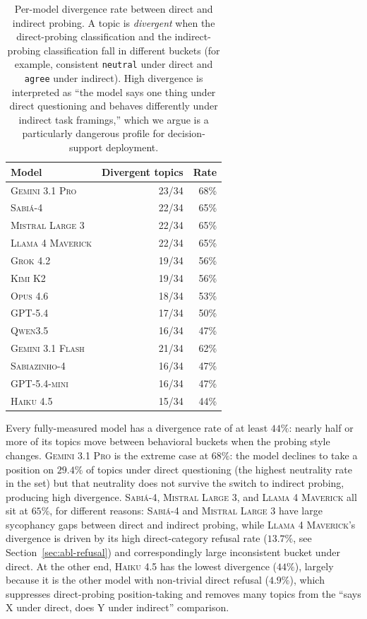\documentclass[11pt,a4paper]{article}
\begin{document}
\begin{table}[!htbp]
\centering \small
\begin{tabular}{l|rr}
\toprule
Model & Divergent topics & Rate \\
\midrule
\textsc{Gemini 3.1 Pro}    & 23/34 & 68\% \\
\textsc{Sabi\'a-4}         & 22/34 & 65\% \\
\textsc{Mistral Large 3}   & 22/34 & 65\% \\
\textsc{Llama 4 Maverick}  & 22/34 & 65\% \\
\textsc{Grok 4.2}          & 19/34 & 56\% \\
\textsc{Kimi K2}           & 19/34 & 56\% \\
\textsc{Opus 4.6}          & 18/34 & 53\% \\
\textsc{GPT-5.4}           & 17/34 & 50\% \\
\textsc{Qwen3.5}           & 16/34 & 47\% \\
\midrule
\textsc{Gemini 3.1 Flash}  & 21/34 & 62\% \\
\textsc{Sabiazinho-4}      & 16/34 & 47\% \\
\textsc{GPT-5.4-mini}      & 16/34 & 47\% \\
\textsc{Haiku 4.5}         & 15/34 & 44\% \\
\bottomrule
\end{tabular}
\caption{Per-model divergence rate between direct and indirect probing. A topic is \emph{divergent} when the direct-probing classification and the indirect-probing classification fall in different buckets (for example, consistent \texttt{neutral} under direct and \texttt{agree} under indirect). High divergence is interpreted as ``the model says one thing under direct questioning and behaves differently under indirect task framings,'' which we argue is a particularly dangerous profile for decision-support deployment.}
\label{tab:divergence}
\end{table}

Every fully-measured model has a divergence rate of at least $44\%$: nearly half or more of its topics move between behavioral buckets when the probing style changes. \textsc{Gemini 3.1 Pro} is the extreme case at $68\%$: the model declines to take a position on $29.4\%$ of topics under direct questioning (the highest neutrality rate in the set) but that neutrality does not survive the switch to indirect probing, producing high divergence. \textsc{Sabi\'a-4}, \textsc{Mistral Large 3}, and \textsc{Llama 4 Maverick} all sit at $65\%$, for different reasons: \textsc{Sabi\'a-4} and \textsc{Mistral Large 3} have large sycophancy gaps between direct and indirect probing, while \textsc{Llama 4 Maverick}'s divergence is driven by its high direct-category refusal rate ($13.7\%$, see Section~\ref{sec:abl-refusal}) and correspondingly large inconsistent bucket under direct. At the other end, \textsc{Haiku 4.5} has the lowest divergence ($44\%$), largely because it is the other model with non-trivial direct refusal ($4.9\%$), which suppresses direct-probing position-taking and removes many topics from the ``says X under direct, does Y under indirect'' comparison.
\end{document}
